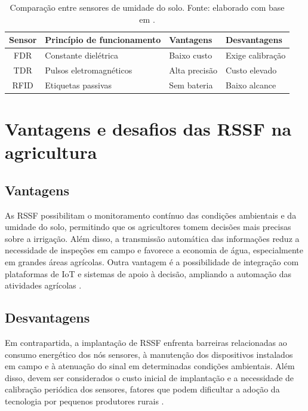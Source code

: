 \documentclass[conference]{IEEEtran}
\begin{document}
\begin{table}[!t]
  \caption{Comparação entre sensores de umidade do solo. Fonte: elaborado com base em \cite{hardie2020}.}
  \label{tab:sensores-umidade}
  \centering
  \footnotesize
  \renewcommand{\arraystretch}{1.15}
  \begin{tabularx}{\columnwidth}{|c|Y|Y|Y|}
    \hline
    \textbf{Sensor} & \textbf{Princípio de funcionamento} & \textbf{Vantagens} & \textbf{Desvantagens} \\
    \hline
    FDR & Constante dielétrica & Baixo custo & Exige calibração \\
    \hline
    TDR & Pulsos eletromagnéticos & Alta precisão & Custo elevado \\
    \hline
    RFID & Etiquetas passivas & Sem bateria & Baixo alcance \\
    \hline
  \end{tabularx}
\end{table}

\section{Vantagens e desafios das RSSF na agricultura}

\subsection{Vantagens}

As RSSF possibilitam o monitoramento contínuo das condições ambientais e da umidade do solo, permitindo que os agricultores tomem decisões mais precisas sobre a irrigação. Além disso, a transmissão automática das informações reduz a necessidade de inspeções em campo e favorece a economia de água, especialmente em grandes áreas agrícolas. Outra vantagem é a possibilidade de integração com plataformas de IoT e sistemas de apoio à decisão, ampliando a automação das atividades agrícolas \cite{ojha2015}.

\subsection{Desvantagens}

Em contrapartida, a implantação de RSSF enfrenta barreiras relacionadas ao consumo energético dos nós sensores, à manutenção dos dispositivos instalados em campo e à atenuação do sinal em determinadas condições ambientais. Além disso, devem ser considerados o custo inicial de implantação e a necessidade de calibração periódica dos sensores, fatores que podem dificultar a adoção da tecnologia por pequenos produtores rurais \cite{akyildiz2002,ojha2015}.
\end{document}
